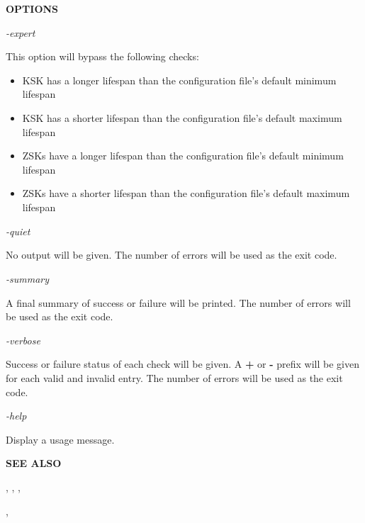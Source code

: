 {\bf OPTIONS}

\begin{description}

\item {\it -expert}\verb" "

This option will bypass the following checks:

\begin{itemize}

\item KSK has a longer lifespan than the configuration file's default minimum
lifespan

\item KSK has a shorter lifespan than the configuration file's default maximum
lifespan

\item ZSKs have a longer lifespan than the configuration file's default minimum
lifespan

\item ZSKs have a shorter lifespan than the configuration file's default maximum
lifespan

\end{itemize}

\item {\it -quiet}\verb" "

No output will be given.
The number of errors will be used as the exit code.

\item {\it -summary}\verb" "

A final summary of success or failure will be printed.
The number of errors will be used as the exit code.

\item {\it -verbose}\verb" "

Success or failure status of each check will be given.
A {\bf +} or {\bf -} prefix will be given for each valid and invalid entry.
The number of errors will be used as the exit code.

\item {\it -help}\verb" "

Display a usage message.

\end{description}

{\bf SEE ALSO}

,
,
,

,

